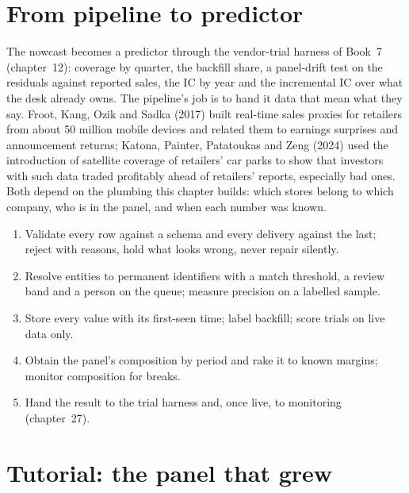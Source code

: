 \section{From pipeline to predictor}

The nowcast becomes a predictor through the vendor-trial harness of Book~7 (chapter~12): coverage by quarter, the backfill
share, a panel-drift test on the residuals against reported sales, the IC by year and the incremental IC over what the desk
already owns. The pipeline's job is to hand it data that mean what they say. Froot, Kang, Ozik and Sadka (2017) built
real-time sales proxies for retailers from about 50 million mobile devices and related them to earnings surprises and
announcement returns; Katona, Painter, Patatoukas and Zeng (2024) used the introduction of satellite coverage of retailers'
car parks to show that investors with such data traded profitably ahead of retailers' reports, especially bad ones. Both
depend on the plumbing this chapter builds: which stores belong to which company, who is in the panel, and when each number
was known.

\begin{method}\label{met:ml:alt:method}
\begin{enumerate}
\item Validate every row against a schema and every delivery against the last; reject with reasons, hold what looks wrong,
never repair silently.
\item Resolve entities to permanent identifiers with a match threshold, a review band and a person on the queue; measure
precision on a labelled sample.
\item Store every value with its first-seen time; label backfill; score trials on live data only.
\item Obtain the panel's composition by period and rake it to known margins; monitor composition for breaks.
\item Hand the result to the trial harness and, once live, to monitoring (chapter~27).
\end{enumerate}
\end{method}

\section{Tutorial: the panel that grew}\label{tut:ml:alternative-data-pipelines:tut}

